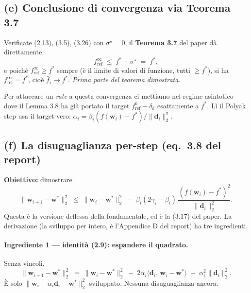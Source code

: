\documentclass[11pt,a4paper]{article}
\theoremstyle{definition}
\newcommand{\w}{\bm{w}}
\newcommand{\dvec}{\bm{d}}
\newcommand{\wstar}{\w^{*}}
\newcommand{\fstar}{f^{*}}
\newcommand{\fbar}{\bar{f}}
\newcommand{\inner}[2]{\langle #1,\, #2\rangle}
\newcommand{\norm}[1]{\lVert #1\rVert}
\begin{document}
\subsection{(e) Conclusione di convergenza via Teorema 3.7}
\label{sub:conclusione}

Verificate (2.13), (3.5), (3.26) con $\sigma^\star=0$, il \textbf{Teorema 3.7} del paper dà
direttamente
\[
f^\infty_{\mathrm{ref}} \;\le\; \fstar+\sigma^\star \;=\; \fstar,
\]
e poiché $f^\infty_{\mathrm{ref}}\ge\fstar$ sempre (è il limite di valori di funzione, tutti
$\ge\fstar$), si ha $f^\infty_{\mathrm{ref}}=\fstar$, cioè $\fbar_i\to\fstar$. \emph{Prima
parte del teorema dimostrata.}

Per attaccare un \emph{rate} a questa convergenza ci mettiamo nel regime asintotico dove il
Lemma 3.8 ha già portato il target $f^k_{\mathrm{ref}}-\delta_k$ esattamente a $\fstar$. Lì il
Polyak step usa il target vero:
$\alpha_i=\beta_i(f(\w_i)-\fstar)/\norm{\dvec_i}_2^2$.

\subsection{(f) La disuguaglianza per-step (eq.~3.8 del report)}
\label{sub:perstep}

\textbf{Obiettivo:} dimostrare
\begin{equation}\label{eq:def-step}
\norm{\w_{i+1}-\wstar}_2^2 \;\le\; \norm{\w_i-\wstar}_2^2 \;-\; \beta_i(2\gamma_i-\beta_i)\,\frac{(f(\w_i)-\fstar)^2}{\norm{\dvec_i}_2^2}.
\end{equation}
Questa è la versione deflessa della fondamentale, ed è la (3.17) del paper. La derivazione (la
sviluppo per intero, è l'Appendice D del report) ha tre ingredienti.

\paragraph{Ingrediente 1 --- identità (2.9): espandere il quadrato.} Senza vincoli,
\begin{equation}\label{eq:prf-29}
\norm{\w_{i+1}-\wstar}_2^2 \;=\; \norm{\w_i-\wstar}_2^2 \;-\; 2\alpha_i\inner{\dvec_i}{\w_i-\wstar} \;+\; \alpha_i^2\norm{\dvec_i}_2^2 .
\end{equation}
È solo $\norm{\w_i-\alpha_i\dvec_i-\wstar}_2^2$ sviluppato. Nessuna disuguaglianza ancora.
\end{document}
